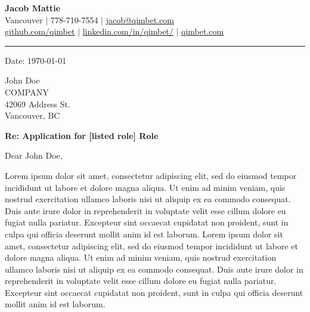 \documentclass[a4paper,10pt]{article}
\begin{document}
	\begin{center}
		\vspace{-2.05mm}
		{\huge \bfseries Jacob Mattie} \\[0.75em]
		Vancouver $|$ 778-710-7554 $|$ 
		\href{mailto:jacob@qimbet.com}{jacob@qimbet.com} \\
		[0.15em]
		
		\href{https://github.com/qimbet}{github.com/qimbet} $|$ 
		\href{https://www.linkedin.com/in/qimbet/}{linkedin.com/in/qimbet/}  $|$
		\href{www.qimbet.com}{qimbet.com}
		

		\noindent\rule{\textwidth}{0.4pt}

		\vspace{2.05mm}
		\noindent
		
	\end{center}



\begin{flushright}
	\vspace{-0.75em}	
	Date: \today
\end{flushright}

\vspace{3em}

\noindent
{\fontsize{11}{13}\selectfont John Doe}\\[0.75em]
COMPANY\\
42069 Address St.\\
Vancouver, BC



\vspace{0.75em}

\noindent
\textbf{Re: Application for [listed role] Role}

\vspace{2em}

Dear John Doe,

\vspace{1.25em}

Lorem ipsum dolor sit amet, consectetur adipiscing elit, sed do eiusmod tempor incididunt ut labore et dolore magna aliqua. Ut enim ad minim veniam, quis nostrud exercitation ullamco laboris nisi ut aliquip ex ea commodo consequat. Duis aute irure dolor in reprehenderit in voluptate velit esse cillum dolore eu fugiat nulla pariatur. Excepteur sint occaecat cupidatat non proident, sunt in culpa qui officia deserunt mollit anim id est laborum. Lorem ipsum dolor sit amet, consectetur adipiscing elit, sed do eiusmod tempor incididunt ut labore et dolore magna aliqua. Ut enim ad minim veniam, quis nostrud exercitation ullamco laboris nisi ut aliquip ex ea commodo consequat. Duis aute irure dolor in reprehenderit in voluptate velit esse cillum dolore eu fugiat nulla pariatur. Excepteur sint occaecat cupidatat non proident, sunt in culpa qui officia deserunt mollit anim id est laborum. \\
\end{document}
